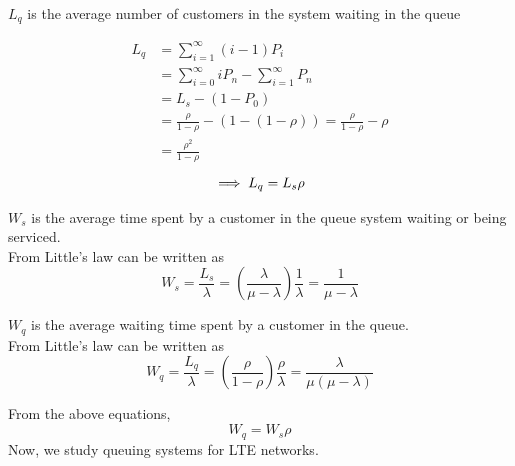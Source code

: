 $L_q$ is the average number of customers in the system waiting in the queue


\begin{align*}
L_q & = \sum_{i=1}^{\infty} (i-1)P_i \\
& = \sum_{i=0}^{\infty} i P_n - \sum_{i=1}^{\infty} P_n \\
& = L_s - (1-P_0) \\
& = \frac{\rho}{1-\rho}-(1-(1-\rho)) =\frac{\rho}{1-\rho} - \rho\\
 & = \frac{\rho^{2}}{1-\rho}
 \end{align*}
\begin{equation}
\implies L_q= L_s\rho\\
\end{equation}

$W_s$ is the average time spent by a customer in the queue system waiting or being serviced.
\\From Little’s law can be written as
\begin{equation}
W_s = \frac{L_s}{\lambda} = \left(\frac{\lambda}{\mu-\lambda}\right)\frac{1}{\lambda} = \frac{1}{\mu-\lambda}
\end{equation}

$W_q$ is the average waiting time spent by a customer in the queue. 
\\From Little’s law can be written as
\begin{equation}
W_q = \frac{L_q}{\lambda} =\left(\frac{\rho}{1-\rho}\right)\frac{\rho}{\lambda} 
= \frac{\lambda}{\mu(\mu-\lambda)}
\end{equation}

From the above equations, 
\begin{equation}
    W_q = W_s\rho
\end{equation}
Now, we study queuing systems for LTE networks.